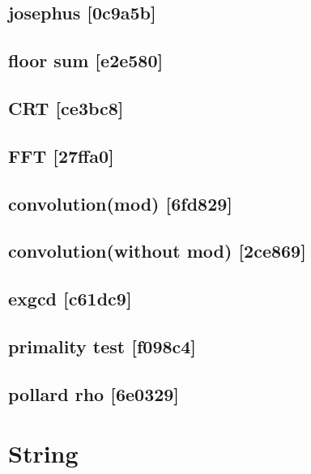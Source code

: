 \subsection{josephus {\footnotesize [0c9a5b]} }

\subsection{floor sum {\footnotesize [e2e580]} }

\subsection{CRT {\footnotesize [ce3bc8]} }

\subsection{FFT {\footnotesize [27ffa0]} }

\subsection{convolution(mod) {\footnotesize [6fd829]} }

\subsection{convolution(without mod) {\footnotesize [2ce869]} }

\subsection{exgcd {\footnotesize [c61dc9]} }

\subsection{primality test {\footnotesize [f098c4]} }

\subsection{pollard rho {\footnotesize [6e0329]} }


\section{String}
